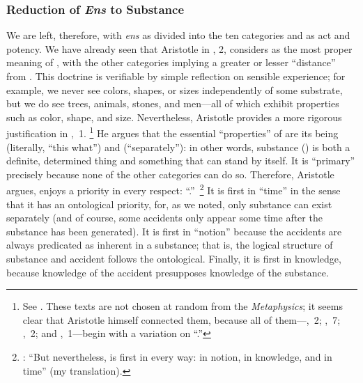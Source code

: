 \subsubsection{Reduction of \emph{Ens} to Substance}

We are left, therefore, with \emph{ens} as divided into the ten categories and as act and potency. We have already seen that Aristotle in , 2, considers  as the most proper meaning of , with the other categories implying a greater or lesser ``distance'' from . This doctrine is verifiable by simple reflection on sensible experience; for example, we never see colors, shapes, or sizes independently of some substrate, but we do see trees, animals, stones, and men---all of which exhibit properties such as color, shape, and size. Nevertheless, Aristotle provides a more rigorous justification in ,~1.%
%
\footnote{See \cite[,~1, 1028a10--1028b8]{aristotle:metaphysics}. These texts are not chosen at random from the \emph{Metaphysics}; it seems clear that Aristotle himself connected them, because all of them---,~2; ,~7; ,~2; and ,~1---begin with a variation on ``.''} He argues that the essential ``properties'' of  are its being  (literally, ``this what'') and  (``separately''): in other words, substance () is both a definite, determined thing and something that can stand by itself. It is ``primary'' precisely because none of the other categories can do so. Therefore, Aristotle argues,  enjoys a priority in every respect: ``.''\,%
%
\footnote{\Cite[,~1, 1028a33]{aristotle:metaphysics}: ``But nevertheless,  is first in every way: in notion, in knowledge, and in time'' (my translation).} It is first in ``time'' in the sense that it has an ontological priority, for, as we noted, only substance can exist separately (and of course, some accidents only appear some time after the substance has been generated). It is first in ``notion'' because the accidents are always predicated as inherent in a substance; that is, the logical structure of substance and accident follows the ontological. Finally, it is first in knowledge, because knowledge of the accident presupposes knowledge of the substance.%
%

